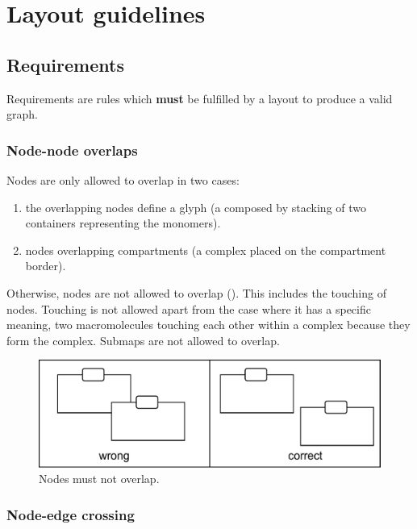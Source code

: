 \newpage

\section{Layout guidelines}

\subsection{Requirements}

Requirements are rules which \textbf{must} be fulfilled by a layout to
produce a valid \SBGNAFLone graph.

\subsubsection{Node-node overlaps}
\label{af:NoNoOv}

Nodes are only allowed to overlap in two cases:
\begin{enumerate}
  \item the overlapping nodes define a glyph (\eg a 
  composed by stacking of two containers representing the monomers).
  \item nodes overlapping compartments
  (\eg a complex placed on the compartment border).
\end{enumerate}
Otherwise, nodes are not allowed to overlap (). This includes the
touching of nodes. Touching is not allowed apart from the case where
it has a specific meaning, \eg two macromolecules touching each
other within a complex because they form the complex. Submaps
are not allowed to overlap.

\begin{figure}[h!]
  \centering
  \includegraphics[scale=0.3]{images/layout-node-node}
  \caption{Nodes must not overlap.}\label{fig:af:layout1}
\end{figure}

\subsubsection{Node-edge crossing}
\label{af:crosEdNoRe}

